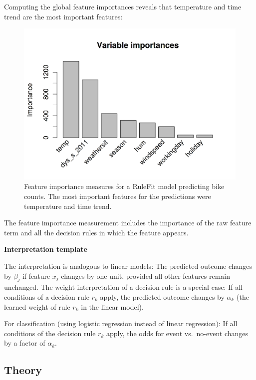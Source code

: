 \documentclass[12pt,]{krantz}
\begin{document}
Computing the global feature importances reveals that temperature and
time trend are the most important features:

\begin{figure}

{\centering \includegraphics[width=\textwidth]{images/rulefit-importance-1} 

}

\caption{Feature importance measures for a RuleFit model predicting bike counts. The most important features for the predictions were temperature and time trend.}\label{fig:rulefit-importance}
\end{figure}

The feature importance measurement includes the importance of the raw
feature term and all the decision rules in which the feature appears.

\textbf{Interpretation template}

The interpretation is analogous to linear models: The predicted outcome
changes by \(\beta_j\) if feature \(x_j\) changes by one unit, provided
all other features remain unchanged. The weight interpretation of a
decision rule is a special case: If all conditions of a decision rule
\(r_k\) apply, the predicted outcome changes by \(\alpha_k\) (the
learned weight of rule \(r_k\) in the linear model).

For classification (using logistic regression instead of linear
regression): If all conditions of the decision rule \(r_k\) apply, the
odds for event vs.~no-event changes by a factor of \(\alpha_k\).

\subsection{Theory}\label{theory-1}
\end{document}
